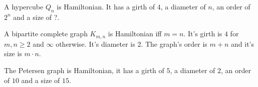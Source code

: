 \documentclass[a4paper]{article}
\begin{document}
	\begin{solution}{9}
		\begin{theorem}{A hypercube $Q_n$ is Hamiltonian. It has a girth of $4$, a diameter of $n$, an order of $2^n$ and a size of ?.}
		\end{theorem}
		\begin{theorem}{A bipartite complete graph $K_{m, n}$ is Hamiltonian iff $m = n$. It's girth is $4$ for $m, n \geq 2$ and $\infty$ otherwise. It's diameter is $2$. The graph's order is $m + n$ and it's size is $m \cdot n$.}
		\end{theorem}
		\begin{theorem}{The Petersen graph is Hamiltonian, it has a girth of $5$, a diameter of $2$, an order of $10$ and a size of $15$.}
		\end{theorem}
	\end{solution}
	\newpage
\end{document}
